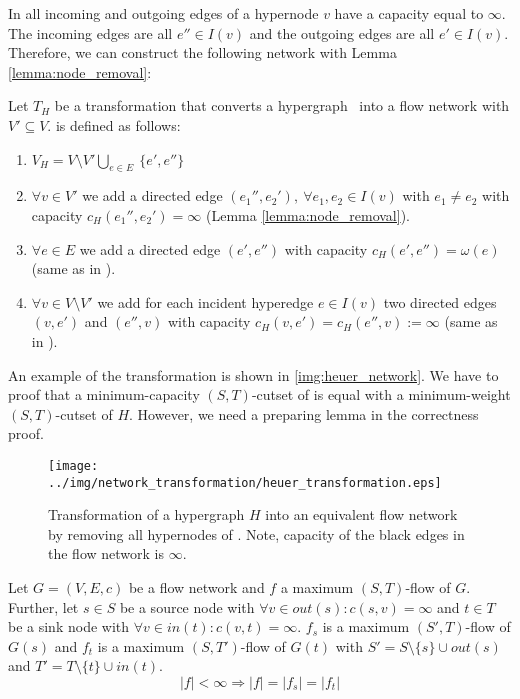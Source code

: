 In  all incoming and outgoing edges of a hypernode $v$ have a
capacity equal to $\infty$. The incoming edges are all $e'' \in I(v)$ and
the outgoing edges are all $e' \in I(v)$. Therefore, we can construct the
following network with Lemma \ref{lemma:node_removal}:

\begin{definition}
Let $T_H$ be a transformation that converts a hypergraph \HypergraphDef~into 
a flow network  with $V' \subseteq V$.  is defined as follows:
\begin{enumerate}
\item $V_H = V\setminus V' \bigcup\limits_{e \in E}\ \{e', e''\}$
\item $\forall v \in V'$ we add a directed edge $(e_1'', e_2'),\ \forall e_1, e_2 \in I(v)$ 
      with $e_1 \neq e_2$ with capacity $c_H(e_1'', e_2') = \infty$ (Lemma \ref{lemma:node_removal}).
\item $\forall e \in E$ we add a directed edge $(e',e'')$
      with capacity $c_H(e',e'') = \omega(e)$ (same as in ).
\item $\forall v \in V\setminus V'$ we add for each incident hyperedge $e \in I(v)$ two directed
      edges $(v,e')$ and $(e'',v)$ with capacity 
      $c_H(v,e') = c_H(e'',v) := \infty$ (same as in ).
\end{enumerate} 
\end{definition}

An example of the transformation is shown in \autoref{img:heuer_network}.
We have to proof that a minimum-capacity $(S,T)$-cutset
of  is equal with a minimum-weight $(S,T)$-cutset of $H$. However,
we need a preparing lemma in the correctness proof.

\begin{figure}
\centering
\texttt{[image: ../img/network\_transformation/heuer\_transformation.eps]}
\caption{Transformation of a hypergraph $H$ into an equivalent flow network  by removing
         all hypernodes of . Note, capacity of the black edges in the flow network is $\infty$.}
\label{img:heuer_network}
\end{figure}

\begin{lemma}
\label{lemma:source_and_sink_removal}
Let $G = (V,E,c)$ be a flow network and $f$ a maximum $(S,T)$-flow of $G$.
Further, let $s \in S$ be a source node with $\forall v \in out(s): c(s,v) = \infty$
and $t \in T$ be a sink node with $\forall v \in in(t): c(v,t) = \infty$.
$f_s$ is a maximum $(S',T)$-flow of $G(s)$ and $f_t$ is a maximum $(S,T')$-flow
of $G(t)$ with $S' = S\setminus \{s\} \cup out(s)$ and $T' = T \setminus \{t\}
\cup in(t)$.
\[|f| < \infty \Rightarrow |f| = |f_s| = |f_t|\]
\end{lemma}

